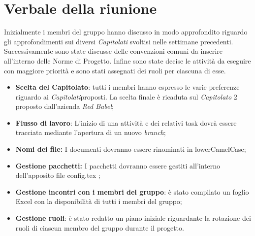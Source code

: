 \section{Verbale della riunione}
		 Inizialmente i membri del gruppo hanno discusso in modo approfondito riguardo gli approfondimenti sui diversi \textit{Capitolati\glos} svoltisi nelle settimane precedenti. Successivamente sono state discusse delle convenzioni comuni da inserire all'interno delle Norme di Progetto. Infine sono state decise le attività da eseguire con maggiore priorità e sono stati assegnati dei ruoli per ciascuna di esse.
	\begin{itemize}
		\item \textbf {Scelta del Capitolato\glos}: tutti i membri hanno espresso le varie preferenze riguardo ai \textit{Capitolati}\glo proposti. La scelta finale è ricaduta sul \textit{Capitolato\glo} 2 proposto dall'azienda \textit{Red Babel};
		\item \textbf {Flusso di lavoro}: L'inizio di una attività e dei relativi task dovrà essere tracciata mediante l'apertura di un nuovo \textit{branch\glo};
		\item \textbf{Nomi dei file:} I documenti dovranno essere rinominati in lowerCamelCase;
		\item \textbf{Gestione pacchetti:} I pacchetti dovranno essere gestiti all'interno dell'apposito file config.tex ;
		\item \textbf {Gestione incontri con i membri del gruppo}: è stato compilato un foglio Excel con la disponibilità di tutti i membri del gruppo;
		\item \textbf {Gestione ruoli}: è stato redatto un piano iniziale riguardante la rotazione dei ruoli di ciascun membro del gruppo durante il progetto.
	\end{itemize}
